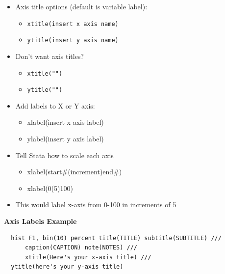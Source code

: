 \documentclass[]{book}
\providecommand{\tightlist}{%
  \setlength{\itemsep}{0pt}\setlength{\parskip}{0pt}}
\begin{document}
\begin{itemize}
\tightlist
\item
  Axis title options (default is variable label):

  \begin{itemize}
  \tightlist
  \item
    \texttt{xtitle(insert\ x\ axis\ name)}
  \item
    \texttt{ytitle(insert\ y\ axis\ name)}
  \end{itemize}
\item
  Don't want axis titles?

  \begin{itemize}
  \tightlist
  \item
    \texttt{xtitle("")}
  \item
    \texttt{ytitle("")}
  \end{itemize}
\item
  Add labels to X or Y axis:

  \begin{itemize}
  \tightlist
  \item
    xlabel(insert x axis label)
  \item
    ylabel(insert y axis label)
  \end{itemize}
\item
  Tell Stata how to scale each axis

  \begin{itemize}
  \tightlist
  \item
    xlabel(start\#(increment)end\#)
  \item
    xlabel(0(5)100)
  \end{itemize}
\item
  This would label x-axis from 0-100 in increments of 5
\end{itemize}

\textbf{Axis Labels Example}

\begin{verbatim}
  hist F1, bin(10) percent title(TITLE) subtitle(SUBTITLE) ///
      caption(CAPTION) note(NOTES) ///
      xtitle(Here's your x-axis title) ///
  ytitle(here's your y-axis title)
\end{verbatim}
\end{document}
